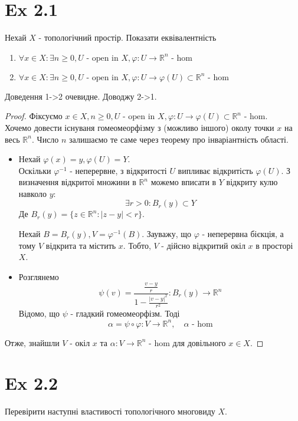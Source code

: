 \documentclass[10pt, a4paper]{article} %
\newcommand{\R}{\mathbb{R}}
\begin{document}
\section*{Ex 2.1}
\begin{mdframed}
Нехай $X$ - топологічний простір. Показати еквівалентність
\begin{enumerate}
    \item $\forall x \in X: \exists n\ge 0, U \text{ - open in } X, \varphi:U \to \R^n \text{ - hom}$
    \item $\forall x \in X: \exists n\ge 0, U \text{ - open in } X, \varphi:U \to \varphi(U) \subset \R^n \text{ - hom}$
\end{enumerate}
\end{mdframed}
Доведення 1->2 очевидне. Доводжу 2->1.
\begin{proof}
    Фіксуємо 
    $x\in X, n\ge0, U \text{ - open in } X, \varphi:U \to \varphi(U) \subset \R^n \text{ - hom}$.\\
    Хочемо довести існуваня гомеомеорфізму з (можливо іншого) околу точки $x$ на весь $\R^n$. 
    Число $n$ залишаємо те саме через теорему про інваріантність області.
\begin{itemize}
    \item 
    Нехай $\varphi(x) = y, \varphi(U) = Y$.\\
    Оскільки $\varphi^{-1}$ - неперервне, з відкритості $U$ випливає відкритість $\varphi(U)$.
    З визначення відкритої множини в $\R^n$ можемо вписати в $Y$ відкриту кулю навколо $y$:
    \[\exists r>0: B_r(y) \subset Y\]
    Де $B_r(y) = \{z\in \R^n : |z-y| < r\}$.
    
    Нехай $B = B_r(y), V = \varphi^{-1}(B)$. Зауважу, що $\varphi$ - неперервна бієкція, а тому $V$ відкрита та містить $x$.
    Тобто, $V$ - дійсно відкритий окіл $x$ в просторі $X$.

    \item
    Розглянемо 
    \[\psi(v) = \frac{\frac{v-y}{r}}{1 - \frac{|v-y|^2}{r^2}} : B_r(y) \to \R^n\]
    Відомо, що $\psi$ - гладкий гомеомеорфізм.
    Тоді 
    \[\alpha = \psi\circ\varphi : V \to \R^n, \quad \alpha \text{ - hom}\] 
\end{itemize}
Отже, знайшли $V$ - окіл $x$ та $\alpha : V \to \R^n$ - hom для довільного $x \in X$.
\end{proof}

\newpage
\section*{Ex 2.2}
\begin{mdframed}
    Перевірити наступні властивості топологічного многовиду $X$.
\end{mdframed}
\end{document}
